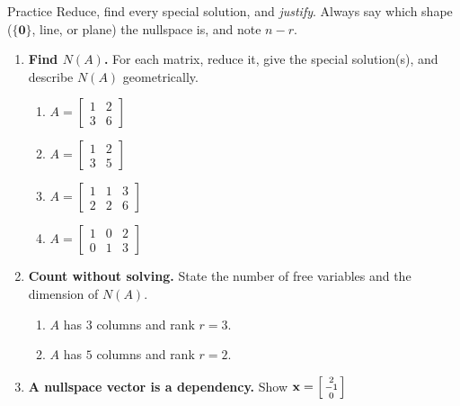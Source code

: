 \documentclass[10pt]{article}
\newcommand{\xx}{\mathbf{x}}
\newcommand{\zero}{\mathbf{0}}
\begin{document}
\namedateperiod

\vspace{0.12in}

\begin{notesbox}{Practice}
Reduce, find every special solution, and \emph{justify}. Always say which shape ($\{\zero\}$, line, or
plane) the nullspace is, and note $n-r$.

\begin{enumerate}[leftmargin=1.9em, itemsep=11pt]
  \item \textbf{Find $N(A)$.} For each matrix, reduce it, give the special solution(s), and describe
        $N(A)$ geometrically.
    \begin{enumerate}[label=(\alph*), leftmargin=1.8em, itemsep=6pt]
      \item $A=\begin{bmatrix} 1 & 2 \\ 3 & 6 \end{bmatrix}$ \vspace{0.9cm}
      \item $A=\begin{bmatrix} 1 & 2 \\ 3 & 5 \end{bmatrix}$ \vspace{0.9cm}
      \item $A=\begin{bmatrix} 1 & 1 & 3 \\ 2 & 2 & 6 \end{bmatrix}$ \vspace{1.1cm}
      \item $A=\begin{bmatrix} 1 & 0 & 2 \\ 0 & 1 & 3 \end{bmatrix}$ \vspace{1.1cm}
    \end{enumerate}
  \item \textbf{Count without solving.} State the number of free variables and the dimension of $N(A)$.
    \begin{enumerate}[label=(\alph*), leftmargin=1.8em, itemsep=4pt]
      \item $A$ has $3$ columns and rank $r=3$. \hfill
      \item $A$ has $5$ columns and rank $r=2$. \hfill
    \end{enumerate}
    \vspace{0.9cm}
  \item \textbf{A nullspace vector is a dependency.} Show $\xx=\begin{bsmallmatrix} 2\\-1\\0 \end{bsmallmatrix}$

\end{enumerate}
\end{notesbox}
\end{document}
